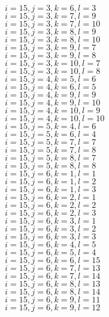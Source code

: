\documentclass[14pt]{article}
\begin{document}
    $i=15,j=3,k=6,l=3 $ \\ 
    $i=15,j=3,k=7,l=9 $ \\ 
    $i=15,j=3,k=7,l=10 $ \\ 
    $i=15,j=3,k=8,l=9 $ \\ 
    $i=15,j=3,k=8,l=10 $ \\ 
    $i=15,j=3,k=9,l=7 $ \\ 
    $i=15,j=3,k=9,l=8 $ \\ 
    $i=15,j=3,k=10,l=7 $ \\ 
    $i=15,j=3,k=10,l=8 $ \\ 
    $i=15,j=4,k=5,l=6 $ \\ 
    $i=15,j=4,k=6,l=5 $ \\ 
    $i=15,j=4,k=9,l=9 $ \\ 
    $i=15,j=4,k=9,l=10 $ \\ 
    $i=15,j=4,k=10,l=9 $ \\ 
    $i=15,j=4,k=10,l=10 $ \\ 
    $i=15,j=5,k=4,l=6 $ \\ 
    $i=15,j=5,k=6,l=4 $ \\ 
    $i=15,j=5,k=7,l=7 $ \\ 
    $i=15,j=5,k=7,l=8 $ \\ 
    $i=15,j=5,k=8,l=7 $ \\ 
    $i=15,j=5,k=8,l=8 $ \\ 
    $i=15,j=6,k=1,l=1 $ \\ 
    $i=15,j=6,k=1,l=2 $ \\ 
    $i=15,j=6,k=1,l=3 $ \\ 
    $i=15,j=6,k=2,l=1 $ \\ 
    $i=15,j=6,k=2,l=2 $ \\ 
    $i=15,j=6,k=2,l=3 $ \\ 
    $i=15,j=6,k=3,l=1 $ \\ 
    $i=15,j=6,k=3,l=2 $ \\ 
    $i=15,j=6,k=3,l=3 $ \\ 
    $i=15,j=6,k=4,l=5 $ \\ 
    $i=15,j=6,k=5,l=4 $ \\ 
    $i=15,j=6,k=6,l=15 $ \\ 
    $i=15,j=6,k=7,l=13 $ \\ 
    $i=15,j=6,k=7,l=14 $ \\ 
    $i=15,j=6,k=8,l=13 $ \\ 
    $i=15,j=6,k=8,l=14 $ \\ 
    $i=15,j=6,k=9,l=11 $ \\ 
    $i=15,j=6,k=9,l=12 $ \\ 
\end{document}
